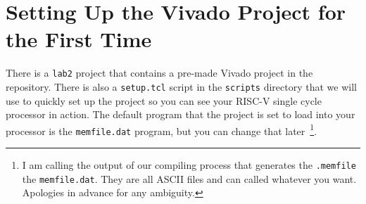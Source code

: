 \documentclass{article}
\begin{document}
\section{Setting Up the Vivado Project for the First Time}

There is a \verb!lab2! project that contains a pre-made Vivado
project in the repository.  There is also a \verb|setup.tcl| script in the \verb!scripts! directory
that we will use to quickly set up the
project so you can see your RISC-V single cycle processor in action.  The default
program that the project is set to load into your processor is the 
\verb|memfile.dat| program, but you can change that later~\footnote{I
am calling the output of our compiling process that generates the
\verb!.memfile! the \verb!memfile.dat!.  They are all ASCII files and
can called whatever you want.  Apologies in advance for any ambiguity.}.
\end{document}
